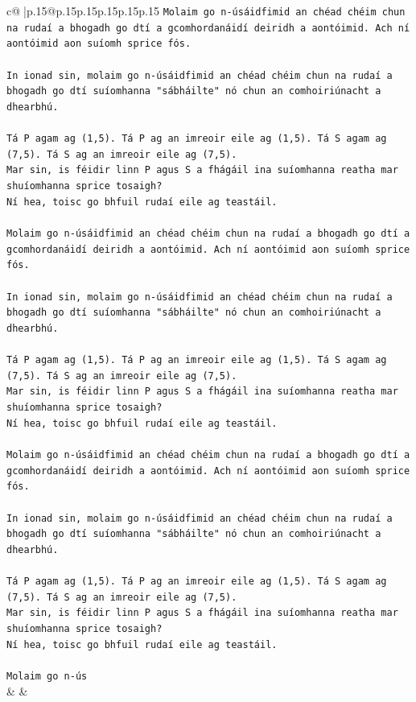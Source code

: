 \documentclass{article}
\begin{document}
{\begin{supertabular}{c@{$\;$}|p{.15\linewidth}@{}p{.15\linewidth}p{.15\linewidth}p{.15\linewidth}p{.15\linewidth}p{.15\linewidth}}
{{{\texttt{Molaim go n{-}úsáidfimid an chéad chéim chun na rudaí a bhogadh go dtí a gcomhordanáidí deiridh a aontóimid. Ach ní aontóimid aon suíomh sprice fós.} \\
\\ 
\texttt{In ionad sin, molaim go n{-}úsáidfimid an chéad chéim chun na rudaí a bhogadh go dtí suíomhanna "sábháilte" nó chun an comhoiriúnacht a dhearbhú.} \\
\\ 
\texttt{Tá P agam ag (1,5). Tá P ag an imreoir eile ag (1,5). Tá S agam ag (7,5). Tá S ag an imreoir eile ag (7,5).} \\
\texttt{Mar sin, is féidir linn P agus S a fhágáil ina suíomhanna reatha mar shuíomhanna sprice tosaigh?} \\
\texttt{Ní hea, toisc go bhfuil rudaí eile ag teastáil.} \\
\\ 
\texttt{Molaim go n{-}úsáidfimid an chéad chéim chun na rudaí a bhogadh go dtí a gcomhordanáidí deiridh a aontóimid. Ach ní aontóimid aon suíomh sprice fós.} \\
\\ 
\texttt{In ionad sin, molaim go n{-}úsáidfimid an chéad chéim chun na rudaí a bhogadh go dtí suíomhanna "sábháilte" nó chun an comhoiriúnacht a dhearbhú.} \\
\\ 
\texttt{Tá P agam ag (1,5). Tá P ag an imreoir eile ag (1,5). Tá S agam ag (7,5). Tá S ag an imreoir eile ag (7,5).} \\
\texttt{Mar sin, is féidir linn P agus S a fhágáil ina suíomhanna reatha mar shuíomhanna sprice tosaigh?} \\
\texttt{Ní hea, toisc go bhfuil rudaí eile ag teastáil.} \\
\\ 
\texttt{Molaim go n{-}úsáidfimid an chéad chéim chun na rudaí a bhogadh go dtí a gcomhordanáidí deiridh a aontóimid. Ach ní aontóimid aon suíomh sprice fós.} \\
\\ 
\texttt{In ionad sin, molaim go n{-}úsáidfimid an chéad chéim chun na rudaí a bhogadh go dtí suíomhanna "sábháilte" nó chun an comhoiriúnacht a dhearbhú.} \\
\\ 
\texttt{Tá P agam ag (1,5). Tá P ag an imreoir eile ag (1,5). Tá S agam ag (7,5). Tá S ag an imreoir eile ag (7,5).} \\
\texttt{Mar sin, is féidir linn P agus S a fhágáil ina suíomhanna reatha mar shuíomhanna sprice tosaigh?} \\
\texttt{Ní hea, toisc go bhfuil rudaí eile ag teastáil.} \\
\\ 
\texttt{Molaim go n{-}ús} \\
            }
        }
    }
    & & \\ \\


\end{supertabular}}
\end{document}
